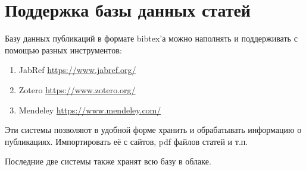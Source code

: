 \section{Поддержка базы данных статей}

Базу данных публикаций в формате bibtex'а можно наполнять и поддерживать с помощью разных инструментов:

\begin{enumerate}
	\item JabRef \href{https://www.jabref.org/}{https://www.jabref.org/} 
	\item Zotero \href{https://www.zotero.org/}{https://www.zotero.org/}
	\item Mendeley \href{https://www.mendeley.com/}{https://www.mendeley.com/}
\end{enumerate}

Эти системы позволяют в удобной форме хранить и обрабатывать информацию о публикациях. Импортировать её с сайтов, pdf файлов статей и т.п.

Последние две системы также хранят всю базу в облаке.





